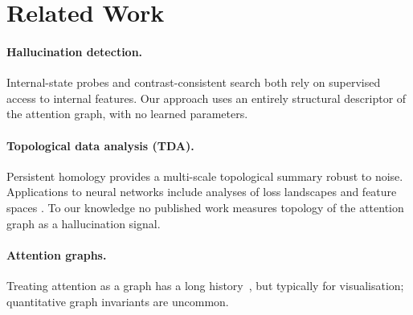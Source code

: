 \section{Related Work}
\paragraph{Hallucination detection.} Internal-state probes
\cite{azaria2023internal} and contrast-consistent search
\cite{burns2023discovering} both rely on supervised access to
internal features. Our approach uses an entirely structural
descriptor of the attention graph, with no learned parameters.

\paragraph{Topological data analysis (TDA).} Persistent homology
\cite{edelsbrunner2008persistent} provides a multi-scale topological
summary robust to noise. Applications to neural networks include
analyses of loss landscapes \cite{horoi2022exploring} and feature
spaces \cite{naitzat2020topology}. To our knowledge no published
work measures topology of the attention graph as a hallucination
signal.

\paragraph{Attention graphs.} Treating attention as a graph has a
long history~\cite{vig2019analyzing}, but typically for visualisation;
quantitative graph invariants are uncommon.
